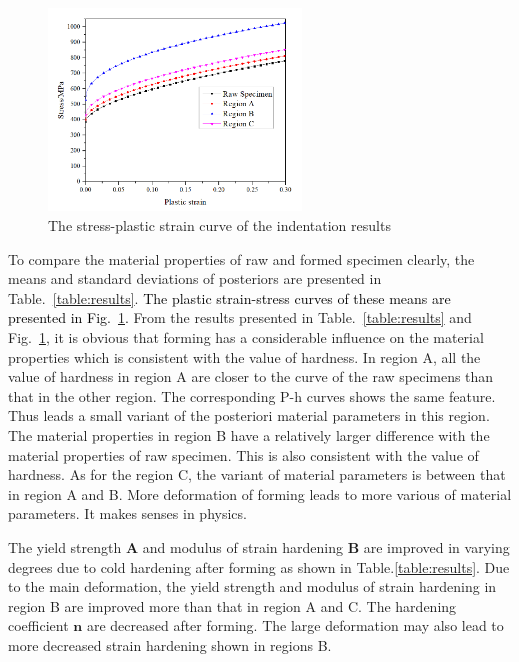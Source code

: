 \documentclass[review]{elsarticle}
\begin{document}
\begin{figure}[h!]
    \centering
    \includegraphics[width=0.6\textwidth]{figs/JCcurveresults.png}
    \caption{The stress-plastic strain curve of the indentation results}
    \label{fig:plasticresults}
\end{figure}

To compare the material properties of raw and formed specimen clearly, the means and standard deviations of posteriors are presented in Table.~\ref{table:results}. \textcolor{black}{The plastic strain-stress curves of these means are presented in Fig.~\ref{fig:plasticresults}.} From the results presented in Table.~\ref{table:results} and Fig.~\ref{fig:plasticresults}, it is obvious that forming has a considerable influence on the material properties which is consistent with the value of hardness. In region A, all the value of hardness in region A are closer to the curve of the raw specimens than that in the other region. The corresponding P-h curves shows the same feature. Thus leads a small variant of the posteriori material parameters in this region. The material properties in region B have a relatively larger difference with the material properties of raw specimen. This is also consistent with the value of hardness. As for the region C, the variant of material parameters is between that in region A and B. More deformation of forming leads to more various of material parameters. It makes senses in physics.

The yield strength $\mathbf{A}$ and modulus of strain hardening $\mathbf{B}$ are improved in varying degrees due to cold hardening after forming as shown in Table.\ref{table:results}. Due to the main deformation, the yield strength and modulus of strain hardening in region B are improved more than that in region A and C. The hardening coefficient $\mathbf{n}$ are decreased after forming. The large deformation may also lead to more decreased strain hardening shown in regions B. 
\end{document}
